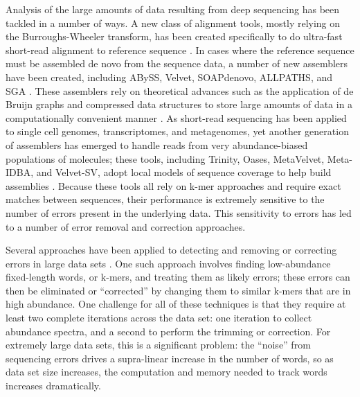 \documentclass[10pt]{article}
\begin{document}
Analysis of the large amounts of data resulting from deep sequencing
has been tackled in a number of ways.  A new class of alignment tools,
mostly relying on the Burroughs-Wheeler transform, has been created
specifically to do ultra-fast short-read alignment to reference
sequence \cite{pubmed19430453}.  In cases where the reference sequence must be assembled de
novo from the sequence data, a number of new assemblers have been
created, including ABySS, Velvet, SOAPdenovo, ALLPATHS, and SGA
\cite{pubmed20211242,pubmed21187386,pubmed22156294}.
These assemblers rely on theoretical advances such as the application
of de Bruijn graphs and compressed data structures to store large
amounts of data in a computationally convenient manner \cite{pubmed22068540,pubmed20529929}.  As short-read
sequencing has been applied to single cell genomes, transcriptomes,
and metagenomes, yet another generation of assemblers has emerged to
handle reads from very abundance-biased populations of molecules;
these tools, including Trinity, Oases, MetaVelvet, Meta-IDBA, and
Velvet-SV, adopt local models of sequence coverage to help build
assemblies \cite{pubmed21572440,pubmed22368243,metavelvet,pubmed21685107,pubmed21926975}.  Because these tools all rely on k-mer approaches and
require exact matches between sequences, their performance is
extremely sensitive to the number of errors present in the underlying
data.  This sensitivity to errors has led to a number of error removal
and correction approaches.

Several approaches have been applied to detecting and removing or
correcting errors in large data sets \cite{pubmed21685062,pubmed15059830,pubmed21114842}.
One such approach involves finding low-abundance fixed-length
words, or k-mers, and treating them as likely errors; these errors can
then be eliminated or ``corrected'' by changing them to similar k-mers
that are in high abundance.  One challenge for all of these techniques is
that they require at least two complete iterations across the data
set: one iteration to collect abundance spectra, and a second to perform the
trimming or correction.  For extremely large data sets, this is a
significant problem: the ``noise'' from sequencing errors drives a
supra-linear increase in the number of words, so as data set size
increases, the computation and memory needed to track words increases
dramatically.
\end{document}
